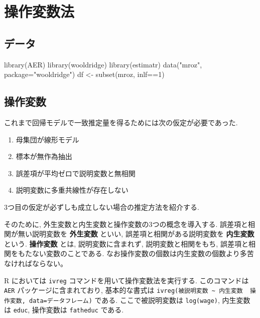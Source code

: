 \documentclass[
  letterpaper,
  xelatex,
  ja=standard, xelatex]{bxjsbook}
\newenvironment{Shaded}{\begin{snugshade}}{\end{snugshade}}
\newcommand{\AttributeTok}[1]{\textcolor[rgb]{0.40,0.45,0.13}{#1}}
\newcommand{\DecValTok}[1]{\textcolor[rgb]{0.68,0.00,0.00}{#1}}
\newcommand{\FunctionTok}[1]{\textcolor[rgb]{0.28,0.35,0.67}{#1}}
\newcommand{\NormalTok}[1]{\textcolor[rgb]{0.00,0.23,0.31}{#1}}
\newcommand{\OtherTok}[1]{\textcolor[rgb]{0.00,0.23,0.31}{#1}}
\newcommand{\SpecialCharTok}[1]{\textcolor[rgb]{0.37,0.37,0.37}{#1}}
\newcommand{\StringTok}[1]{\textcolor[rgb]{0.13,0.47,0.30}{#1}}
\providecommand{\tightlist}{%
  \setlength{\itemsep}{0pt}\setlength{\parskip}{0pt}}\usepackage{longtable,booktabs,array}
\begin{document}

\chapter{操作変数法}\label{ux64cdux4f5cux5909ux6570ux6cd5}

\section{データ}\label{ux30c7ux30fcux30bf}

\begin{Shaded}
\begin{Highlighting}[]
\FunctionTok{library}\NormalTok{(AER)}
\FunctionTok{library}\NormalTok{(wooldridge)}
\FunctionTok{library}\NormalTok{(estimatr)}
\FunctionTok{data}\NormalTok{(}\StringTok{"mroz"}\NormalTok{, }\AttributeTok{package=}\StringTok{"wooldridge"}\NormalTok{)}
\NormalTok{df }\OtherTok{\textless{}{-}} \FunctionTok{subset}\NormalTok{(mroz, inlf}\SpecialCharTok{==}\DecValTok{1}\NormalTok{)}
\end{Highlighting}
\end{Shaded}

\section{操作変数}\label{ux64cdux4f5cux5909ux6570}

これまで回帰モデルで一致推定量を得るためには次の仮定が必要であった.

\begin{enumerate}
\def\labelenumi{\arabic{enumi}.}
\tightlist
\item
  母集団が線形モデル
\item
  標本が無作為抽出
\item
  誤差項が平均ゼロで説明変数と無相関
\item
  説明変数に多重共線性が存在しない
\end{enumerate}

3つ目の仮定が必ずしも成立しない場合の推定方法を紹介する.

そのために, 外生変数と内生変数と操作変数の3つの概念を導入する.
誤差項と相関が無い説明変数を \textbf{外生変数} といい,
誤差項と相関がある説明変数を \textbf{内生変数} という. \textbf{操作変数}
とは, 説明変数に含まれず, 説明変数と相関をもち,
誤差項と相関をもたない変数のことである.
なお操作変数の個数は内生変数の個数より多苦なければならない。

R においては \texttt{ivreg} コマンドを用いて操作変数法を実行する.
このコマンドは \texttt{AER} パッケージに含まれており, 基本的な書式は
\texttt{ivreg(被説明変数\ \textasciitilde{}\ 内生変数\ \textbar{}\ 操作変数,\ data=データフレーム)}
である. ここで被説明変数は \texttt{log(wage)}, 内生変数は \texttt{educ},
操作変数は \texttt{fatheduc} である.
\end{document}
